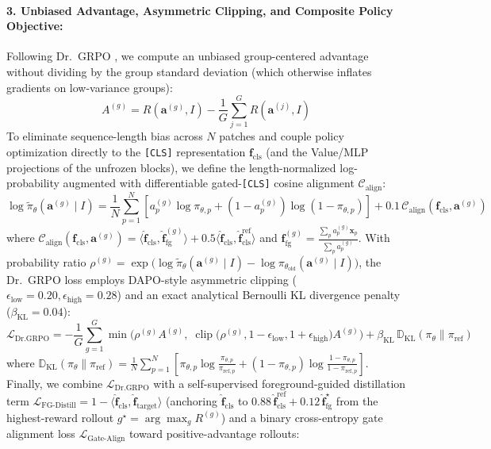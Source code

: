 \documentclass[11pt,a4paper]{article}
\begin{document}
\paragraph{3. Unbiased Advantage, Asymmetric Clipping, and Composite Policy Objective:}
Following Dr.\ GRPO \cite{liu2025drgrpo}, we compute an unbiased group-centered advantage without dividing by the group standard deviation (which otherwise inflates gradients on low-variance groups):
\begin{equation}
A^{(g)} = R(\mathbf{a}^{(g)}, I) - \frac{1}{G}\sum_{j=1}^G R(\mathbf{a}^{(j)}, I)
\label{eq:dr_grpo_advantage}
\end{equation}
To eliminate sequence-length bias across $N$ patches and couple policy optimization directly to the \texttt{[CLS]} representation $\mathbf{f}_{\text{cls}}$ (and the Value/MLP projections of the unfrozen blocks), we define the length-normalized log-probability augmented with differentiable gated-\texttt{[CLS]} cosine alignment $\mathcal{C}_{\text{align}}$:
\begin{equation}
\log \tilde{\pi}_\theta(\mathbf{a}^{(g)} \mid I) = \frac{1}{N}\sum_{p=1}^N \left[a_p^{(g)}\log \pi_{\theta, p} + (1 - a_p^{(g)})\log(1 - \pi_{\theta, p})\right] + 0.1\,\mathcal{C}_{\text{align}}(\mathbf{f}_{\text{cls}}, \mathbf{a}^{(g)})
\label{eq:length_norm_logprob}
\end{equation}
where $\mathcal{C}_{\text{align}}(\mathbf{f}_{\text{cls}}, \mathbf{a}^{(g)}) = \langle \hat{\mathbf{f}}_{\text{cls}}, \hat{\mathbf{f}}_{\text{fg}}^{(g)} \rangle + 0.5\langle \hat{\mathbf{f}}_{\text{cls}}, \hat{\mathbf{f}}_{\text{cls}}^{\text{ref}} \rangle$ and $\mathbf{f}_{\text{fg}}^{(g)} = \frac{\sum_p a_p^{(g)} \mathbf{x}_p}{\sum_p a_p^{(g)}}$. With probability ratio $\rho^{(g)} = \exp\!\big(\log \tilde{\pi}_\theta(\mathbf{a}^{(g)} \mid I) - \log \pi_{\theta_{\text{old}}}(\mathbf{a}^{(g)} \mid I)\big)$, the Dr.\ GRPO loss employs DAPO-style asymmetric clipping \cite{yu2025dapo} ($\epsilon_{\text{low}} = 0.20, \epsilon_{\text{high}} = 0.28$) and an exact analytical Bernoulli KL divergence penalty ($\beta_{\text{KL}} = 0.04$):
\begin{equation}
\mathcal{L}_{\text{Dr.GRPO}} = -\frac{1}{G}\sum_{g=1}^G \min\!\Big(\rho^{(g)} A^{(g)},\; \operatorname{clip}\!\big(\rho^{(g)}, 1-\epsilon_{\text{low}}, 1+\epsilon_{\text{high}}\big) A^{(g)}\Big) + \beta_{\text{KL}}\,\mathbb{D}_{\text{KL}}\!\left(\pi_\theta \parallel \pi_{\text{ref}}\right)
\label{eq:dr_grpo_loss}
\end{equation}
where $\mathbb{D}_{\text{KL}}(\pi_\theta \parallel \pi_{\text{ref}}) = \frac{1}{N}\sum_{p=1}^N \left[\pi_{\theta,p}\log\frac{\pi_{\theta,p}}{\pi_{\text{ref},p}} + (1-\pi_{\theta,p})\log\frac{1-\pi_{\theta,p}}{1-\pi_{\text{ref},p}}\right]$. Finally, we combine $\mathcal{L}_{\text{Dr.GRPO}}$ with a self-supervised foreground-guided distillation term $\mathcal{L}_{\text{FG-Distill}} = 1 - \langle \hat{\mathbf{f}}_{\text{cls}}, \hat{\mathbf{f}}_{\text{target}} \rangle$ (anchoring $\hat{\mathbf{f}}_{\text{cls}}$ to $0.88\,\hat{\mathbf{f}}_{\text{cls}}^{\text{ref}} + 0.12\,\hat{\mathbf{f}}_{\text{fg}}^{\star}$ from the highest-reward rollout $g^\star = \arg\max_g R^{(g)}$) and a binary cross-entropy gate alignment loss $\mathcal{L}_{\text{Gate-Align}}$ toward positive-advantage rollouts:
\end{document}
